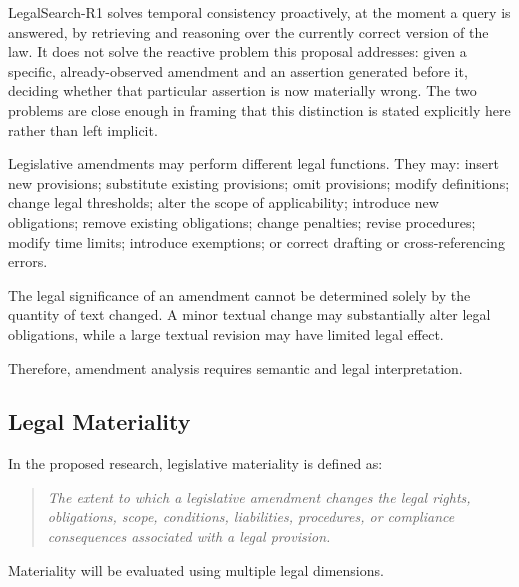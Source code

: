 LegalSearch-R1 solves temporal consistency proactively, at the moment a query is answered, by retrieving and reasoning over the currently correct version of the law. It does not solve the reactive problem this proposal addresses: given a specific, already-observed amendment and an assertion generated before it, deciding whether that particular assertion is now materially wrong. The two problems are close enough in framing that this distinction is stated explicitly here rather than left implicit.

Legislative amendments may perform different legal functions. They may: insert new provisions; substitute existing provisions; omit provisions; modify definitions; change legal thresholds; alter the scope of applicability; introduce new obligations; remove existing obligations; change penalties; revise procedures; modify time limits; introduce exemptions; or correct drafting or cross-referencing errors.

The legal significance of an amendment cannot be determined solely by the quantity of text changed. A minor textual change may substantially alter legal obligations, while a large textual revision may have limited legal effect.

Therefore, amendment analysis requires semantic and legal interpretation.

\subsection{Legal Materiality}

\label{sec:2-6-2}

In the proposed research, legislative materiality is defined as:

\begin{quote}\itshape The extent to which a legislative amendment changes the legal rights, obligations, scope, conditions, liabilities, procedures, or compliance consequences associated with a legal provision.\end{quote}

Materiality will be evaluated using multiple legal dimensions.


